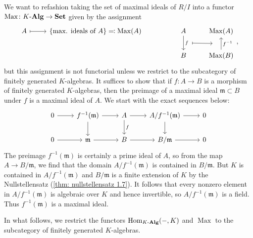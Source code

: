 \documentclass[11pt,leqno]{article}
\theoremstyle{plain}
\theoremstyle{definition}
\numberwithin{equation}{section}
\numberwithin{lem}{section}
\newcommand{\cbr}[1]{\left\{#1\right\}}
\DeclareMathOperator{\Hom}{Hom}
\DeclareMathOperator{\Max}{Max}
\newcommand{\catname}[1]{{\normalfont\mathbf{#1}}}
\newcommand{\Set}{\catname{Set}}
\newcommand{\Kalg}{K\text{-}\catname{Alg}}
\begin{document}
We want to refashion taking the set of maximal ideals of $R/I$ into a functor $\Max\colon \Kalg\to\Set$ given by the assignment
\begin{equation}
  \begin{tikzcd}[ampersand replacement=\&]
    A \& {\cbr{\text{max. ideals of }A}\eqqcolon \Max(A)} \&\& A \& {\Max(A)} \\
    \&\&\& B \& {\Max(B)}
    \arrow[maps to, from=1-1, to=1-2]
    \arrow[""{name=0, anchor=center, inner sep=0}, "f", from=1-4, to=2-4]
    \arrow[""{name=1, anchor=center, inner sep=0}, "{f^{-1}}"', from=2-5, to=1-5]
    \arrow[shorten <=12pt, shorten >=12pt, maps to, from=0, to=1]
  \end{tikzcd},
\end{equation}
but this assignment is not functorial unless we restrict to the subcategory of finitely generated $K$-algebras. It suffices to show that if $f\colon A\to B$ is a morphism of finitely generated $K$-algebras, then the preimage of a maximal ideal $\mathfrak m\subset B$ under $f$ is a maximal ideal of $A$. We start with the exact sequences below: 
\begin{equation}
  \begin{tikzcd}[ampersand replacement=\&]
    0 \& {f^{-1}(\mathfrak m)} \& A \& {A/f^{-1}(\mathfrak m)} \& 0 \\
    0 \& {\mathfrak m} \& B \& {B/\mathfrak m} \& 0
    \arrow[from=1-1, to=1-2]
    \arrow[from=1-2, to=1-3]
    \arrow[from=1-2, to=2-2]
    \arrow[from=1-3, to=1-4]
    \arrow["f", from=1-3, to=2-3]
    \arrow[from=1-4, to=1-5]
    \arrow[from=1-4, to=2-4]
    \arrow[from=2-1, to=2-2]
    \arrow[from=2-2, to=2-3]
    \arrow[from=2-3, to=2-4]
    \arrow[from=2-4, to=2-5]
  \end{tikzcd}
\end{equation}
The preimage $f^{-1}(\mathfrak m)$ is certainly a prime ideal of $A$, so from the map $A\to B/\mathfrak m$, we find that the domain $A/f^{-1}(\mathfrak m)$ is contained in $B/\mathfrak m$. But $K$ is contained in $A/f^{-1}(\mathfrak m)$ and $B/\mathfrak m$ is a finite extension of $K$ by the Nullstellensatz (\cref{thm: nullstellensatz 1.7}). It follows that every nonzero element in $A/f^{-1}(\mathfrak m)$ is algebraic over $K$ and hence invertible, so $A/f^{-1}(\mathfrak m)$ is a field. Thus $f^{-1}(\mathfrak m)$ is a maximal ideal.

In what follows, we restrict the functors $\Hom_{\Kalg}(-,K)$ and $\Max$ to the subcategory of finitely generated $K$-algebras. 
\end{document}

